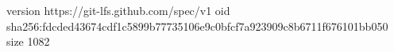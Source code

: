 version https://git-lfs.github.com/spec/v1
oid sha256:fdcded43674cdf1c5899b77735106e9c0bfcf7a923909c8b6711f676101bb050
size 1082
